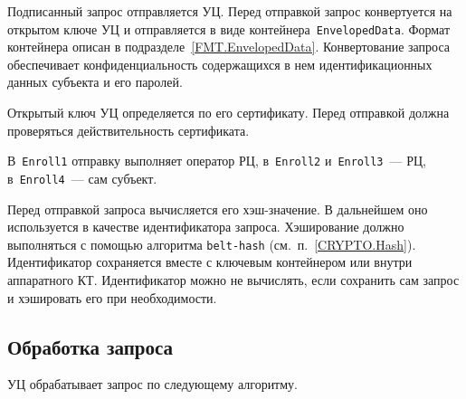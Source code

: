 Подписанный запрос отправляется УЦ. Перед отправкой запрос конвертуется на 
открытом ключе УЦ и отправляется в виде контейнера~\texttt{EnvelopedData}. 
Формат контейнера описан в подразделе~\ref{FMT.EnvelopedData}. 
Конвертование запроса обеспечивает конфиденциальность содержащихся в нем 
идентификационных данных субъекта и его паролей.  

Открытый ключ УЦ определяется по его сертификату. Перед отправкой 
должна проверяться действительность сертификата.

В~\texttt{Enroll1} отправку выполняет оператор РЦ,
в~\texttt{Enroll2} и~\texttt{Enroll3}~--- РЦ,
в~\texttt{Enroll4}~--- сам субъект.

Перед отправкой запроса вычисляется его хэш-значение. 
В дальнейшем оно используется в качестве идентификатора запроса. 
Хэширование должно выполняться с помощью алгоритма 
\texttt{belt-hash} (см.~п.~\ref{CRYPTO.Hash}).
%
Идентификатор сохраняется вместе с ключевым контейнером или внутри 
аппаратного КТ.
%
Идентификатор можно не вычислять, если сохранить сам запрос и хэшировать 
его при необходимости.

\subsection{Обработка запроса}\label{PROCESSES.Enroll.Issue}

УЦ обрабатывает запрос по следующему алгоритму.

